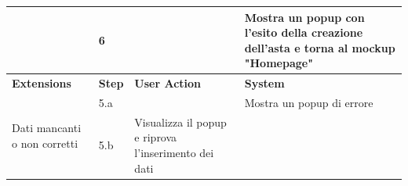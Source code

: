 \begin{table}[H]
\begin{tabularx}{\linewidth}{|p{135pt}|p{25pt}|>{\raggedright\arraybackslash}X|>{\raggedright\arraybackslash}X|}
		\cline{2-4}                                                                   & 6                                                                                                                                                                                  &                                                                  & Mostra un popup con l'esito della creazione dell'asta e torna al mockup "Homepage" \\

		\hline \rowcolor[HTML]{DCDCDC}
		\textbf{\sffamily Extensions}                                                 & \textbf{\sffamily Step}                                                                                                                                                            & \textbf{\sffamily User Action}                                   & \textbf{\sffamily System}                                                          \\
		\hline
		\multirow{2}{135pt}{\raggedright\arraybackslash Dati mancanti o non corretti} & 5.a                                                                                                                                                                                &                                                                  & Mostra un popup di errore                                                          \\
		\cline{2-4}                                                                   & 5.b                                                                                                                                                                                & Visualizza il popup e riprova l'inserimento dei dati             &                                                                                    \\

		\hline
	\end{tabularx}
\end{table}

\newpage
